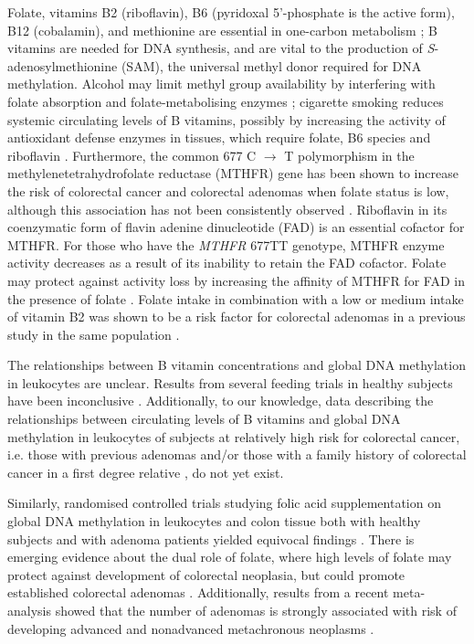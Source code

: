 \noindent Folate, vitamins B2 (riboflavin), B6 (pyridoxal 5'-phosphate is the active form), B12 (cobalamin), and methionine are essential in one-carbon metabolism \cite{c515}; B vitamins are needed for DNA synthesis, and are vital to the production of \emph{S}-adenosylmethionine (SAM), the universal methyl donor required for DNA methylation. Alcohol may limit methyl group availability by interfering with folate absorption and folate-metabolising enzymes \cite{c516}; cigarette smoking reduces systemic circulating levels of B vitamins, possibly by increasing the activity of antioxidant defense enzymes in tissues, which require folate, B6 species and riboflavin \cite{c517}. Furthermore, the common 677 C $\rightarrow$ T polymorphism in the methylenetetrahydrofolate reductase (MTHFR) gene has been shown to increase the risk of colorectal cancer \cite{c518} and colorectal adenomas \cite{c519} when folate status is low, although this association has not been consistently observed \cite{c520,c521,c522}. Riboflavin in its coenzymatic form of flavin adenine dinucleotide (FAD) is an essential cofactor for MTHFR. For those who have the \emph{MTHFR} 677TT genotype, MTHFR enzyme activity decreases as a result of its inability to retain the FAD cofactor. Folate may protect against activity loss by increasing the affinity of MTHFR for FAD in the presence of folate \cite{c523, c524}. Folate intake in combination with a low or medium intake of vitamin B2 was shown to be a risk factor for colorectal adenomas in a previous study in the same population \cite{c525}.

\noindent The relationships between B vitamin concentrations and global DNA methylation in leukocytes are unclear. Results from several feeding trials in healthy subjects have been inconclusive \cite{c526,c527,c528,c529}. Additionally, to our knowledge, data describing the relationships between circulating levels of B vitamins and global DNA methylation in leukocytes of subjects at relatively high risk for colorectal cancer, i.e. those with previous adenomas \cite{c530,c531} and/or those with a family history of colorectal cancer in a first degree relative \cite{c532}, do not yet exist.

\noindent Similarly, randomised controlled trials studying folic acid supplementation on global DNA methylation in leukocytes and colon tissue both with healthy subjects and with adenoma patients yielded equivocal findings \cite{c533,c534,c535,c536,c537,c538,c539,c540}. There is emerging evidence about the dual role of folate, where high levels of folate may protect against development of colorectal neoplasia, but could promote established colorectal adenomas \cite{c541,c542}. Additionally, results from a recent meta-analysis showed that the number of adenomas is strongly associated with risk of developing advanced and nonadvanced metachronous neoplasms \cite{c531}.

